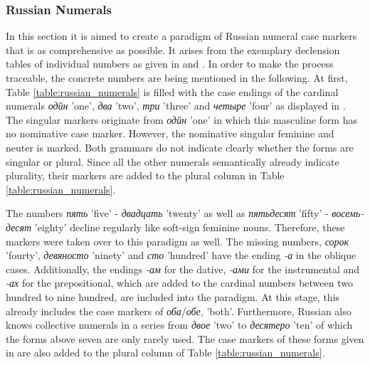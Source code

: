 \documentclass[11pt,a4paper,twoside,openright]{scrbook}
\begin{document}
\subsubsection{Russian Numerals}

In this section it is aimed to create a paradigm of Russian numeral case markers that is as comprehensive as possible. It arises from the exemplary declension tables of individual numbers as given in \citep{wade2020russ} and \citep{kohls2009russ}. In order to make the process traceable, the concrete numbers are being mentioned in the following. At first, Table \ref{table:russian_numerals} is filled with the case endings of the cardinal numerals \foreignlanguage{russian}{\textit{одйн}} 'one', \foreignlanguage{russian}{\textit{два}} 'two', \foreignlanguage{russian}{\textit{три}} 'three' and \foreignlanguage{russian}{\textit{четыре}} 'four' as displayed in \citep{wade2020russ}. The singular markers originate from \foreignlanguage{russian}{\textit{одйн}} 'one' in which this masculine form has no nominative case marker. However, the nominative singular feminine and neuter is marked. Both grammars do not indicate clearly whether the forms are singular or plural. Since all the other numerals semantically already indicate plurality, their markers are added to the plural column in Table \ref{table:russian_numerals}.  

The numbers \foreignlanguage{russian}{\textit{пять}} 'five' - \foreignlanguage{russian}{\textit{двадцать}} 'twenty' as well as \foreignlanguage{russian}{\textit{пятьдесят}} 'fifty' - \foreignlanguage{russian}{\textit{восемьдесят}} 'eighty' decline regularly like soft-sign feminine nouns. Therefore, these markers were taken over to this paradigm as well. The missing numbers, \foreignlanguage{russian}{\textit{сорок}} 'fourty', \foreignlanguage{russian}{\textit{девяносто}} 'ninety' and \foreignlanguage{russian}{\textit{сто}} 'hundred' have the ending \foreignlanguage{russian}{\textit{-а}} in the oblique cases. Additionally, the endings \foreignlanguage{russian}{\textit{-ам}} for the dative, \foreignlanguage{russian}{\textit{-ами}} for the instrumental and \foreignlanguage{russian}{\textit{-ах}} for the prepositional, which are added to the cardinal numbers between two hundred to nine hundred, are included into the paradigm. At this stage, this already includes the case markers of \foreignlanguage{russian}{\textit{оба}/\textit{обе}}, 'both'. 
Furthermore, Russian also knows collective numerals in a series from \foreignlanguage{russian}{\textit{двое}} 'two' to \foreignlanguage{russian}{\textit{десятеро}} 'ten' of which the forms above seven are only rarely used. The case markers of these forms given in \citet{wade2020russ} are also added to the plural column of Table \ref{table:russian_numerals}.
\end{document}
